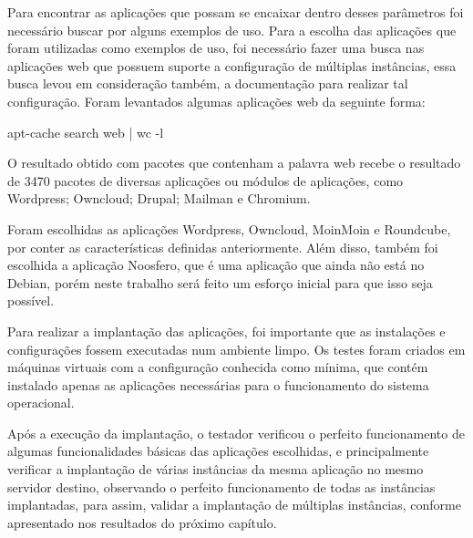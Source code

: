 Para encontrar as aplicações que possam se encaixar dentro desses parâmetros foi necessário buscar por alguns exemplos de uso. Para a escolha das aplicações que
foram utilizadas como exemplos de uso, foi necessário fazer uma busca nas aplicações
web  que possuem suporte a configuração de múltiplas
instâncias, essa busca levou em consideração também, a documentação para realizar
tal configuração. Foram levantados algumas aplicações web da seguinte forma:

\begin{center}
apt-cache search web | wc -l
\end{center}

O resultado obtido com pacotes que contenham a palavra web recebe o resultado de 3470
pacotes de diversas aplicações ou módulos de aplicações, como
Wordpress; Owncloud; Drupal; Mailman e Chromium.
 
Foram escolhidas as aplicações Wordpress, Owncloud, MoinMoin
e Roundcube, por conter as características definidas anteriormente. Além disso,
também foi escolhida a aplicação Noosfero, que é uma aplicação que ainda não
está no Debian, porém neste trabalho será feito um esforço inicial para que isso
seja possível.

Para realizar a implantação das aplicações, foi importante que as 
instalações e configurações
fossem executadas num ambiente limpo. Os testes foram criados
em máquinas virtuais com a configuração conhecida como mínima, que contém
instalado apenas as aplicações necessárias para o funcionamento do sistema operacional.

Após a execução da implantação, o testador verificou o perfeito
funcionamento de algumas funcionalidades básicas das aplicações escolhidas,
e principalmente verificar a implantação de várias instâncias da mesma
aplicação no mesmo servidor destino, observando o perfeito funcionamento de todas as
instâncias implantadas, para assim, validar a implantação de múltiplas instâncias, conforme
apresentado nos resultados do próximo capítulo.
